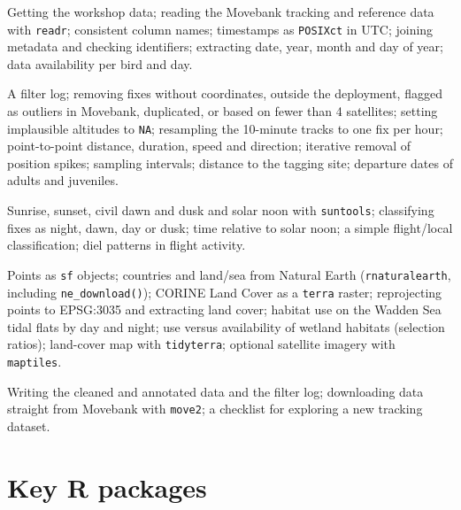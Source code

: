 \documentclass[11pt,a4paper]{article}
\begin{document}
\begin{description}[leftmargin=0pt,style=nextline,itemsep=4pt]
\item[\color{bedark}Part 1 – Reading and pre-processing]
Getting the workshop data; reading the Movebank tracking and reference data with \texttt{readr}; consistent column names; timestamps as \texttt{POSIXct} in UTC; joining metadata and checking identifiers; extracting date, year, month and day of year; data availability per bird and day.
\item[\color{bedark}Part 2 – Cleaning]
A filter log; removing fixes without coordinates, outside the deployment, flagged as outliers in Movebank, duplicated, or based on fewer than 4 satellites; setting implausible altitudes to \texttt{NA}; resampling the 10-minute tracks to one fix per hour; point-to-point distance, duration, speed and direction; iterative removal of position spikes; sampling intervals; distance to the tagging site; departure dates of adults and juveniles.
\item[\color{bedark}Part 3 – Day, night and twilight]
Sunrise, sunset, civil dawn and dusk and solar noon with \texttt{suntools}; classifying fixes as night, dawn, day or dusk; time relative to solar noon; a simple flight/local classification; diel patterns in flight activity.
\item[\color{bedark}Part 4 – Environmental annotation]
Points as \texttt{sf} objects; countries and land/sea from Natural Earth (\texttt{rnaturalearth}, including \texttt{ne\_download()}); CORINE Land Cover as a \texttt{terra} raster; reprojecting points to EPSG:3035 and extracting land cover; habitat use on the Wadden Sea tidal flats by day and night; use versus availability of wetland habitats (selection ratios); land-cover map with \texttt{tidyterra}; optional satellite imagery with \texttt{maptiles}.
\item[\color{bedark}Part 5 – Saving outputs and outlook]
Writing the cleaned and annotated data and the filter log; downloading data straight from Movebank with \texttt{move2}; a checklist for exploring a new tracking dataset.
\end{description}

\section{Key R packages}
\end{document}
